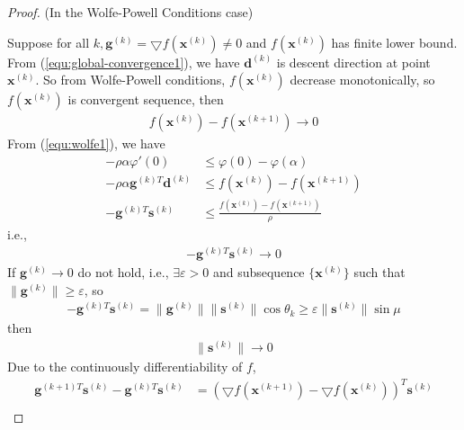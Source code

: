 \begin{proof}
    (In the Wolfe-Powell Conditions case)
    \par
    Suppose for all $k, \mathbf{g}^{(k)} = 
    \bigtriangledown f(\mathbf{x}^{(k)}) \neq 0$
    and $f(\mathbf{x}^{(k)})$ has finite lower bound.
    From (\ref{equ:global-convergence1}), we have
    $\mathbf{d}^{(k)}$ is descent direction at point
    $\mathbf{x}^{(k)}$.
    So from Wolfe-Powell conditions,
    $f(\mathbf{x}^{(k)})$ decrease monotonically,
    so $f(\mathbf{x}^{(k)})$ is convergent sequence,
    then
    \begin{align}
        f(\mathbf{x}^{(k)}) - f(\mathbf{x}^{(k+1)})
        \rightarrow 0
    \end{align}
    From (\ref{equ:wolfe1}), we have
    \begin{align}
        -\rho \alpha \varphi'(0) &\leq
        \varphi(0) - \varphi(\alpha) \\
        -\rho \alpha \mathbf{g}^{(k)T} \mathbf{d}^{(k)}
        &\leq f(\mathbf{x}^{(k)}) - f(\mathbf{x}^{(k+1)}) \\
        - \mathbf{g}^{(k)T} \mathbf{s}^{(k)}
        &\leq \frac{f(\mathbf{x}^{(k)}) - f(\mathbf{x}^{(k+1)})}
        {\rho}
    \end{align}
    i.e.,
    \begin{align}
        - \mathbf{g}^{(k)T} \mathbf{s}^{(k)} 
        \rightarrow 0
    \end{align}
    If $ \mathbf{g}^{(k)} \rightarrow 0$ do not hold,
    i.e., $\exists \varepsilon > 0$ and subsequence
    $\{ \mathbf{x}^{(k)} \}$ such that 
    $\parallel  \mathbf{g}^{(k)} \parallel \geq \varepsilon$,
    so
    \begin{align}
        - \mathbf{g}^{(k)T} \mathbf{s}^{(k)} = 
        \parallel \mathbf{g}^{(k)} \parallel
        \parallel \mathbf{s}^{(k)} \parallel
        \cos \theta_k \geq \varepsilon 
        \parallel \mathbf{s}^{(k)} \parallel
        \sin \mu
    \end{align}
    then
    \begin{align}
        \parallel \mathbf{s}^{(k)} \parallel
        \rightarrow 0
    \end{align}
    Due to the continuously differentiability of $f$,
    \begin{align}
        \mathbf{g}^{(k+1)T} \mathbf{s}^{(k)} - 
        \mathbf{g}^{(k)T} \mathbf{s}^{(k)} &= 
        (\bigtriangledown f(\mathbf{x}^{(k+1)})
        - \bigtriangledown f(\mathbf{x}^{(k)}))^T\mathbf{s}^{(k)} \\

\end{align}
\end{proof}
